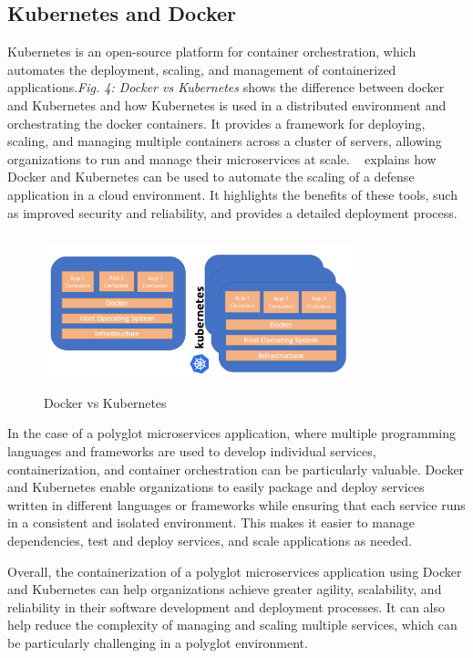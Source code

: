 \subsection{Kubernetes and Docker}
Kubernetes is an open-source platform for container orchestration, which automates the deployment, scaling, and management of containerized applications.\emph{Fig. 4: Docker vs Kubernetes} shows the difference between docker and Kubernetes and how Kubernetes is used in a distributed environment and orchestrating the docker containers. It provides a framework for deploying, scaling, and managing multiple containers across a cluster of servers, allowing organizations to run and manage their microservices at scale.
~\cite{kho2018auto} explains how Docker and Kubernetes can be used to automate the scaling of a defense application in a cloud environment. It highlights the benefits of these tools, such as improved security and reliability, and provides a detailed deployment process.

\begin{figure}
\centering
\includegraphics[width=9cm, height=4.5cm]{docker-vs-kubernetes}
\caption{Docker vs Kubernetes}
\end{figure}

In the case of a polyglot microservices application, where multiple programming languages and frameworks are used to develop individual services, containerization, and container orchestration can be particularly valuable. Docker and Kubernetes enable organizations to easily package and deploy services written in different languages or frameworks while ensuring that each service runs in a consistent and isolated environment. This makes it easier to manage dependencies, test and deploy services, and scale applications as needed.

Overall, the containerization of a polyglot microservices application using Docker and Kubernetes can help organizations achieve greater agility, scalability, and reliability in their software development and deployment processes. It can also help reduce the complexity of managing and scaling multiple services, which can be particularly challenging in a polyglot environment.
